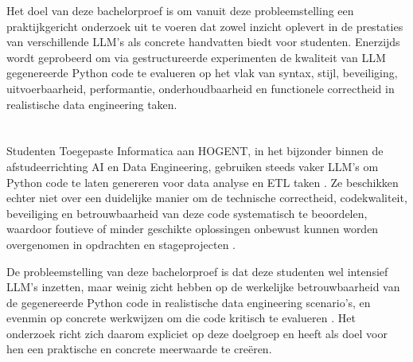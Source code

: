 Het doel van deze bachelorproef is om vanuit deze probleemstelling een praktijkgericht onderzoek uit te voeren dat zowel inzicht oplevert in de prestaties van verschillende LLM’s als concrete handvatten biedt voor studenten. Enerzijds wordt geprobeerd om via gestructureerde experimenten de kwaliteit van LLM gegenereerde Python code te evalueren op het vlak van syntax, stijl, beveiliging, uitvoerbaarheid, performantie, onderhoudbaarheid en functionele correctheid in realistische data engineering taken.



%

\section{}%
\label{sec:probleemstelling}

Studenten Toegepaste Informatica aan HOGENT, in het bijzonder binnen de afstudeerrichting AI en Data Engineering, gebruiken steeds vaker LLM’s om Python code te laten genereren voor data analyse en ETL taken \autocite{Amoah2025}. Ze beschikken echter niet over een duidelijke manier om de technische correctheid, codekwaliteit, beveiliging en betrouwbaarheid van deze code systematisch te beoordelen, waardoor foutieve of minder geschikte oplossingen onbewust kunnen worden overgenomen in opdrachten en stageprojecten \autocite{Oliveira2024}.

De probleemstelling van deze bachelorproef is dat deze studenten wel intensief LLM’s inzetten, maar weinig zicht hebben op de werkelijke betrouwbaarheid van de gegenereerde Python code in realistische data engineering scenario’s, en evenmin op concrete werkwijzen om die code kritisch te evalueren \autocite{Oliveira2024}. Het onderzoek richt zich daarom expliciet op deze doelgroep en heeft als doel voor hen een praktische en concrete meerwaarde te creëren.

